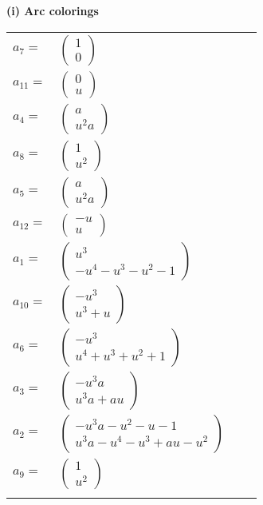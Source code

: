 \documentclass[1p]{elsarticle_modified}
\theoremstyle{definition}
\begin{document}
\flushleft \textbf{(i) Arc colorings}\\
\begin{tabular}{m{7pt} m{180pt} m{7pt} m{180pt} }
\flushright $a_{7}=$&$\begin{pmatrix}1\\0\end{pmatrix}$ \\
\flushright $a_{11}=$&$\begin{pmatrix}0\\u\end{pmatrix}$ \\
\flushright $a_{4}=$&$\begin{pmatrix}a\\u^2 a\end{pmatrix}$ \\
\flushright $a_{8}=$&$\begin{pmatrix}1\\u^2\end{pmatrix}$ \\
\flushright $a_{5}=$&$\begin{pmatrix}a\\u^2 a\end{pmatrix}$ \\
\flushright $a_{12}=$&$\begin{pmatrix}- u\\u\end{pmatrix}$ \\
\flushright $a_{1}=$&$\begin{pmatrix}u^3\\- u^4- u^3- u^2-1\end{pmatrix}$ \\
\flushright $a_{10}=$&$\begin{pmatrix}- u^3\\u^3+u\end{pmatrix}$ \\
\flushright $a_{6}=$&$\begin{pmatrix}- u^3\\u^4+u^3+u^2+1\end{pmatrix}$ \\
\flushright $a_{3}=$&$\begin{pmatrix}- u^3 a\\u^3 a+a u\end{pmatrix}$ \\
\flushright $a_{2}=$&$\begin{pmatrix}- u^3 a- u^2- u-1\\u^3 a- u^4- u^3+a u- u^2\end{pmatrix}$ \\
\flushright $a_{9}=$&$\begin{pmatrix}1\\u^2\end{pmatrix}$\\&\end{tabular}
\end{document}
